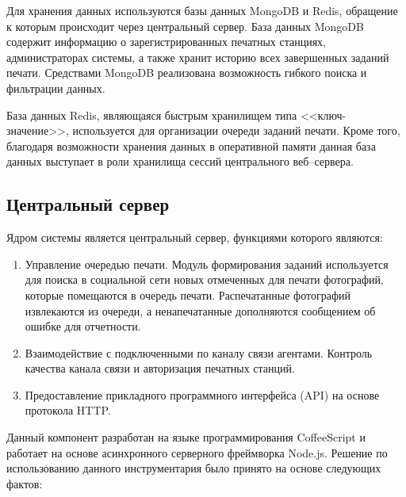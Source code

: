 \documentclass[a4paper,14pt,href]{article}
\begin{document}
Для хранения данных используются базы данных MongoDB и Redis, обращение к которым происходит через центральный сервер. База данных MongoDB содержит
информацию о зарегистрированных печатных станциях, администраторах системы, а также хранит историю всех завершенных заданий печати. Средствами MongoDB реализована возможность гибкого поиска и фильтрации данных\cite{MongoDBBook}.

База данных Redis, являющаяся быстрым хранилищем типа <<ключ-значение>>, используется для организации очереди заданий печати. Кроме того, благодаря возможности хранения данных в оперативной памяти данная база данных выступает в роли хранилища сессий центрального веб--сервера.

\subsection{Центральный сервер}
Ядром системы является центральный сервер, функциями которого являются:

\begin{enumerate}
  \item Управление очередью печати. Модуль формирования заданий используется для поиска в социальной сети новых отмеченных для печати фотографий, которые помещаются в очередь печати. Распечатанные фотографий извлекаются из очереди, а ненапечатанные дополняются сообщением об ошибке для отчетности.

  \item Взаимодействие с подключенными по каналу связи агентами. Контроль качества канала связи и авторизация печатных станций.

  \item Предоставление прикладного программного интерфейса (API) на основе протокола HTTP.
\end{enumerate}

Данный компонент разработан на языке программирования \linebreak CoffeeScript\cite{LittleCoffeeScript} и работает на основе асинхронного серверного фреймворка Node.js. Решение по использованию данного инструментария было принято на основе следующих фактов:
\end{document}
